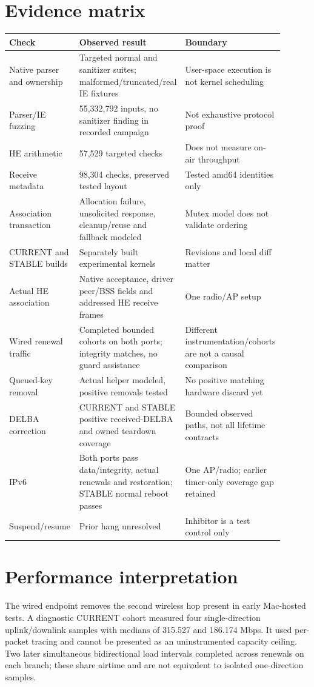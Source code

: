 \documentclass[11pt,letterpaper,oneside]{article}
\begin{document}
\section{Evidence matrix}
\begin{longtable}{p{0.27\linewidth}p{0.36\linewidth}p{0.27\linewidth}}
\toprule Check & Observed result & Boundary\\\midrule\endhead
Native parser and ownership & Targeted normal and sanitizer suites; malformed/truncated/real IE fixtures & User-space execution is not kernel scheduling\\
Parser/IE fuzzing & 55,332,792 inputs, no sanitizer finding in recorded campaign & Not exhaustive protocol proof\\
HE arithmetic & 57,529 targeted checks & Does not measure on-air throughput\\
Receive metadata & 98,304 checks, preserved tested layout & Tested amd64 identities only\\
Association transaction & Allocation failure, unsolicited response, cleanup/reuse and fallback modeled & Mutex model does not validate ordering\\
CURRENT and STABLE builds & Separately built experimental kernels & Revisions and local diff matter\\
Actual HE association & Native acceptance, driver peer/BSS fields and addressed HE receive frames & One radio/AP setup\\
Wired renewal traffic & Completed bounded cohorts on both ports; integrity matches, no guard assistance & Different instrumentation/cohorts are not a causal comparison\\
Queued-key removal & Actual helper modeled, positive removals tested & No positive matching hardware discard yet\\
DELBA correction & CURRENT and STABLE positive received-DELBA and owned teardown coverage & Bounded observed paths, not all lifetime contracts\\
IPv6 & Both ports pass data/integrity, actual renewals and restoration; STABLE normal reboot passes & One AP/radio; earlier timer-only coverage gap retained\\
Suspend/resume & Prior hang unresolved & Inhibitor is a test control only\\
\bottomrule\end{longtable}

\section{Performance interpretation}
The wired endpoint removes the second wireless hop present in early Mac-hosted tests. A diagnostic CURRENT cohort measured four single-direction uplink/downlink samples with medians of 315.527 and 186.174 Mbps. It used per-packet tracing and cannot be presented as an uninstrumented capacity ceiling. Two later simultaneous bidirectional load intervals completed across renewals on each branch; these share airtime and are not equivalent to isolated one-direction samples.
\end{document}
